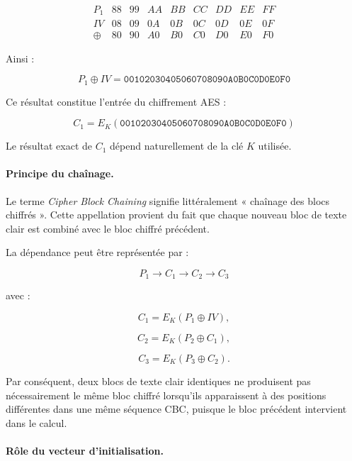 \documentclass[12pt,a4paper]{article}
\begin{document}
\[
\begin{array}{c|cccccccc}
P_1&88&99&AA&BB&CC&DD&EE&FF\\
IV&08&09&0A&0B&0C&0D&0E&0F\\
\hline
\oplus&80&90&A0&B0&C0&D0&E0&F0
\end{array}
\]

Ainsi :

\[
\boxed{
P_1\oplus IV
=
\texttt{00102030405060708090A0B0C0D0E0F0}
}
\]

Ce résultat constitue l'entrée du chiffrement AES :

\[
\boxed{
C_1=
E_K
\left(
\texttt{00102030405060708090A0B0C0D0E0F0}
\right)
}
\]

Le résultat exact de $C_1$ dépend naturellement de la clé $K$ utilisée.



\paragraph{Principe du chaînage.}

Le terme \textit{Cipher Block Chaining} signifie littéralement
« chaînage des blocs chiffrés ». Cette appellation provient du fait
que chaque nouveau bloc de texte clair est combiné avec le bloc
chiffré précédent.

La dépendance peut être représentée par :

\[
\boxed{
P_1\rightarrow C_1\rightarrow C_2\rightarrow C_3
}
\]

avec :

\[
C_1=E_K(P_1\oplus IV),
\]

\[
C_2=E_K(P_2\oplus C_1),
\]

\[
C_3=E_K(P_3\oplus C_2).
\]

Par conséquent, deux blocs de texte clair identiques ne produisent
pas nécessairement le même bloc chiffré lorsqu'ils apparaissent à des
positions différentes dans une même séquence CBC, puisque le bloc
précédent intervient dans le calcul.



\paragraph{Rôle du vecteur d'initialisation.}
\end{document}
